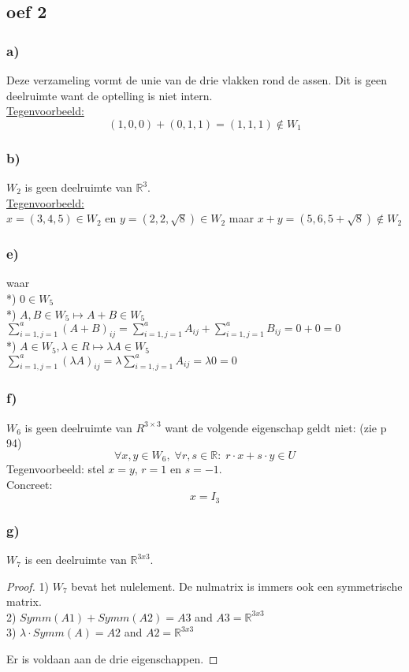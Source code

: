 \documentclass[lineaire_algebra_oplossingen.tex]{subfiles}
\begin{document}
\subsection{oef 2}
\subsubsection*{a)}
Deze verzameling vormt de unie van de drie vlakken rond de assen. Dit is geen deelruimte want de optelling is niet intern.\\
\underline{Tegenvoorbeeld:}\\
\[
(1,0,0) + (0,1,1) = (1,1,1) \not \in W_1
\]
\subsubsection*{b)}
$W_2$ is geen deelruimte van $\mathbb{R}^{3}$.\\
\underline{Tegenvoorbeeld:}\\
$x = (3, 4, 5) \in W_2$ en $y = (2, 2, \sqrt{8}) \in W_2$ maar $x + y = (5, 6, 5 + \sqrt{8}) \not \in W_2$

\subsubsection*{e) }
waar\\
*) $0 \in W_5$ \\
*) $A,B \in W_5 \longmapsto A+B \in W_5$ \\
$ \sum\limits_{i=1,j=1}^a (A+B)_{ij} = \sum\limits_{i=1,j=1}^a A_{ij} + \sum\limits_{i=1,j=1}^a B_{ij} = 0+0 = 0 $ \\
*) $ A \in W_5, \lambda \in R \longmapsto \lambda A \in W_5$ \\
$ \sum\limits_{i=1,j=1}^a (\lambda A)_{ij} = \lambda \sum\limits_{i=1,j=1}^a A_{ij} = \lambda 0 = 0$


\subsubsection*{f)}
$W_6$ is geen deelruimte van $R^{3\times 3}$ want de volgende eigenschap geldt niet: (zie p 94)
\[
\forall x,y\in W_6,\;\forall r,s\in\mathbb{R}:\; r\cdot x+s\cdot y\in U
\]
Tegenvoorbeeld:
stel $x=y$, $r=1$ en $s=-1$.\\
Concreet:
\[
x = I_3
\]

\subsubsection*{g)}
$W_7$ is een deelruimte van $\mathbb{R}^{3x3}$.\\
\begin{proof} 

1) $W_7$ bevat het nulelement. De nulmatrix is immers ook een symmetrische matrix. \\
2) $ Symm(A1) + Symm(A2) = A3 $
	and $A3 = \mathbb{R}^{3x3}$ \\
3) $ \lambda \cdot Symm(A) = A2 $
	and $ A2 = \mathbb{R}^{3x3}$

Er is voldaan aan de drie eigenschappen.

\end{proof}
\end{document}
